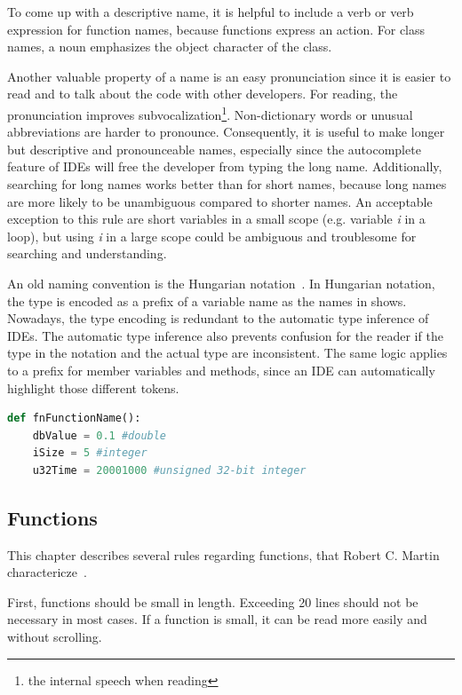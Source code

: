 To come up with a descriptive name, it is helpful to include a verb or verb expression for function names, because functions express an action. For class names, a noun emphasizes the object character of the class.

Another valuable property of a name is an easy pronunciation since it is easier to read and to talk about the code with other developers. For reading, the pronunciation improves subvocalization\footnote{the internal speech when reading}. Non-dictionary words or unusual abbreviations are harder to pronounce. Consequently, it is useful to make longer but descriptive and pronounceable names, especially since the autocomplete feature of IDEs will free the developer from typing the long name. Additionally, searching for long names works better than for short names, because long names are more likely to be unambiguous compared to shorter names. An acceptable exception to this rule are short variables in a small scope (e.g. variable \textit{i} in a loop), but using \textit{i} in a large scope could be ambiguous and troublesome for searching and understanding.

An old naming convention is the Hungarian notation~\cite{simonyi1999hungarian}. In Hungarian notation, the type is encoded as a prefix of a variable name as the names in  shows. Nowadays, the type encoding is redundant to the automatic type inference of IDEs. The automatic type inference also prevents confusion for the reader if the type in the notation and the actual type are inconsistent. The same logic applies to a prefix for member variables and methods, since an IDE can automatically highlight those different tokens.


\begin{lstlisting}[float=t , language=Python, label=lst:hungarian_notation, caption={Example for the Hungerian notation in an adaption to use the prefix to indicate the type.}]
def fnFunctionName():
    dbValue = 0.1 #double
    iSize = 5 #integer
    u32Time = 20001000 #unsigned 32-bit integer
\end{lstlisting}


\subsection{Functions}\label{sec:functions}
This chapter describes several rules regarding functions, that Robert C. Martin charactericze~\cite{martin_clean_2009}. 

First, functions should be small in length. Exceeding 20 lines should not be necessary in most cases. If a function is small, it can be read more easily and without scrolling. 

